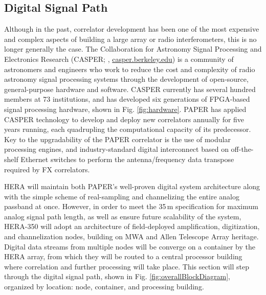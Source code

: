 \documentclass[preprint,11pt]{aastex}
\newcommand{\Mycitep}[1]{\citep{#1}}
\begin{document}
\subsection{Digital Signal Path}
\label{sec:digital}
Although in the past, correlator development has been one of the most expensive and complex aspects of building a large array or radio interferometers, this is no longer generally the case.
The Collaboration for Astronomy Signal Processing and Electronics Research (CASPER; \citealt{parsons_et_al2006}, \url{casper.berkeley.edu}) is a community of astronomers and engineers who work to reduce the cost and complexity of radio astronomy signal processing systems through the development of open-source, general-purpose hardware and software.
CASPER currently has several hundred members at 73 institutions, and has developed six generations of FPGA-based signal processing hardware, shown in Fig. \ref{fig:hardware}.
PAPER has applied CASPER technology to develop and deploy new correlators annually for five years running, each quadrupling the computational capacity of its predecessor.
Key to the upgradability of the PAPER correlator is the use of modular processing engines, and industry-standard digital interconnect based on off-the-shelf Ethernet switches \Mycitep{parsons_et_al2008} to perform the antenna/frequency data transpose required by FX correlators.

HERA will maintain both PAPER's well-proven digital system architecture along with the simple scheme of real-sampling and channelizing the entire analog passband at once.
However, in order to meet the 35\,m specification for maximum analog signal path length, as well as ensure future scalability of the system, HERA-350 will adopt an architecture of field-deployed amplification, digitization, and channelization nodes, building on MWA and Allen Telescope Array heritage.
Digital data streams from multiple nodes will be converge on a container by the HERA array, from which they will be routed to a central processor building where correlation and further processing will take place.
This section will step through the digital signal path, shown in Fig. \ref{fig:overallBlockDiagram}, organized by location:  node, container, and processing building.

\end{document}
